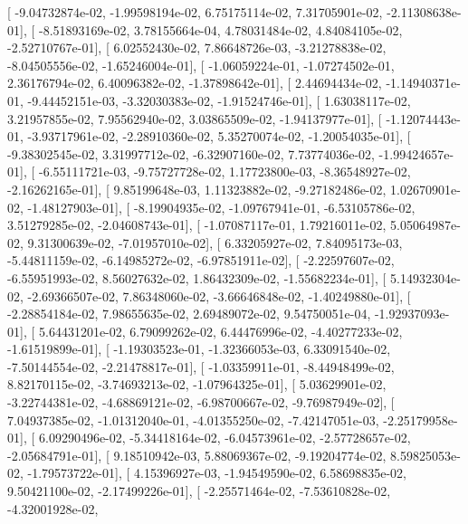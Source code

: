 \documentclass{article}
\begin{document}
       [ -9.04732874e-02,  -1.99598194e-02,   6.75175114e-02,
          7.31705901e-02,  -2.11308638e-01],
       [ -8.51893169e-02,   3.78155664e-04,   4.78031484e-02,
          4.84084105e-02,  -2.52710767e-01],
       [  6.02552430e-02,   7.86648726e-03,  -3.21278838e-02,
         -8.04505556e-02,  -1.65246004e-01],
       [ -1.06059224e-01,  -1.07274502e-01,   2.36176794e-02,
          6.40096382e-02,  -1.37898642e-01],
       [  2.44694434e-02,  -1.14940371e-01,  -9.44452151e-03,
         -3.32030383e-02,  -1.91524746e-01],
       [  1.63038117e-02,   3.21957855e-02,   7.95562940e-02,
          3.03865509e-02,  -1.94137977e-01],
       [ -1.12074443e-01,  -3.93717961e-02,  -2.28910360e-02,
          5.35270074e-02,  -1.20054035e-01],
       [ -9.38302545e-02,   3.31997712e-02,  -6.32907160e-02,
          7.73774036e-02,  -1.99424657e-01],
       [ -6.55111721e-03,  -9.75727728e-02,   1.17723800e-03,
         -8.36548927e-02,  -2.16262165e-01],
       [  9.85199648e-03,   1.11323882e-02,  -9.27182486e-02,
          1.02670901e-02,  -1.48127903e-01],
       [ -8.19904935e-02,  -1.09767941e-01,  -6.53105786e-02,
          3.51279285e-02,  -2.04608743e-01],
       [ -1.07087117e-01,   1.79216011e-02,   5.05064987e-02,
          9.31300639e-02,  -7.01957010e-02],
       [  6.33205927e-02,   7.84095173e-03,  -5.44811159e-02,
         -6.14985272e-02,  -6.97851911e-02],
       [ -2.22597607e-02,  -6.55951993e-02,   8.56027632e-02,
          1.86432309e-02,  -1.55682234e-01],
       [  5.14932304e-02,  -2.69366507e-02,   7.86348060e-02,
         -3.66646848e-02,  -1.40249880e-01],
       [ -2.28854184e-02,   7.98655635e-02,   2.69489072e-02,
          9.54750051e-04,  -1.92937093e-01],
       [  5.64431201e-02,   6.79099262e-02,   6.44476996e-02,
         -4.40277233e-02,  -1.61519899e-01],
       [ -1.19303523e-01,  -1.32366053e-03,   6.33091540e-02,
         -7.50144554e-02,  -2.21478817e-01],
       [ -1.03359911e-01,  -8.44948499e-02,   8.82170115e-02,
         -3.74693213e-02,  -1.07964325e-01],
       [  5.03629901e-02,  -3.22744381e-02,  -4.68869121e-02,
         -6.98700667e-02,  -9.76987949e-02],
       [  7.04937385e-02,  -1.01312040e-01,  -4.01355250e-02,
         -7.42147051e-03,  -2.25179958e-01],
       [  6.09290496e-02,  -5.34418164e-02,  -6.04573961e-02,
         -2.57728657e-02,  -2.05684791e-01],
       [  9.18510942e-03,   5.88069367e-02,  -9.19204774e-02,
          8.59825053e-02,  -1.79573722e-01],
       [  4.15396927e-03,  -1.94549590e-02,   6.58698835e-02,
          9.50421100e-02,  -2.17499226e-01],
       [ -2.25571464e-02,  -7.53610828e-02,  -4.32001928e-02,
\end{document}
